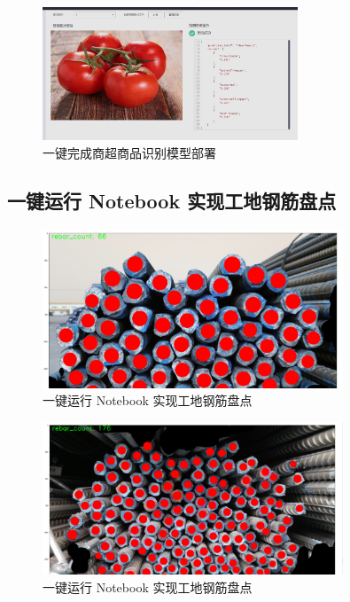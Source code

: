 \documentclass[a4paper,twoside,zihao=5,UTF8]{ctexart}
\begin{document}
\begin{spacing}{1.2}
\begin{figure}[H]
	\centering
	\caption{一键完成商超商品识别模型部署}
	\label{fig:ai1}
	\includegraphics[width=0.68\textwidth]{task1.png}
\end{figure}

\subsection{一键运行 Notebook 实现工地钢筋盘点}

\begin{figure}[H]
	\centering
	\caption{一键运行 Notebook 实现工地钢筋盘点}
	\label{fig:ai21}
	\includegraphics[width=0.8\textwidth]{task2_1.png}
\end{figure}

\begin{figure}[H]
	\centering
	\caption{一键运行 Notebook 实现工地钢筋盘点}
	\label{fig:ai22}
	\includegraphics[width=0.8\textwidth]{task2_2.png}
\end{figure}


\end{spacing}
\end{document}
